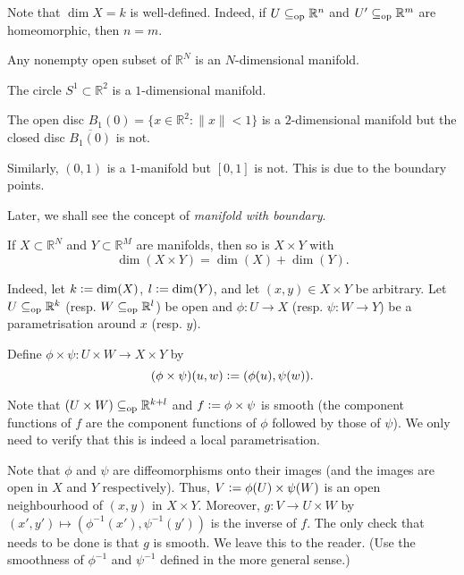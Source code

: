 Note that $\dim X = k$ is well-defined. Indeed, if $U \subseteq_{\operatorname{op}} \mathbb{R}^{n}$ and $U' \subseteq_{\operatorname{op}} \mathbb{R}^{m}$ are homeomorphic, then $n = m$.

\begin{ex}
	Any nonempty open subset of $\mathbb{R}^{N}$ is an $N$-dimensional manifold.
\end{ex}

\begin{ex}
	The circle $S^{1} \subset \mathbb{R}^{2}$ is a $1$-dimensional manifold.

	The open disc $B_{1}(0) = \{x \in \mathbb{R}^{2} : \|x\| < 1\}$ is a $2$-dimensional manifold but the closed disc $\overline{B_{1}(0)}$ is not. 

	Similarly, $(0, 1)$ is a $1$-manifold but $[0, 1]$ is not. This is due to the boundary points.

	Later, we shall see the concept of \emph{manifold with boundary}.
\end{ex}

\begin{ex}
	If $X \subset \mathbb{R}^{N}$ and $Y \subset \mathbb{R}^{M}$ are manifolds, then so is $X \times Y$ with
	\begin{equation*} 
		\boxed{\dim(X \times Y) = \dim(X) + \dim(Y).}
	\end{equation*}

	Indeed, let $k \vcentcolon= \dim(X)$, $l \vcentcolon= \dim(Y)$, and let $(x, y) \in X \times Y$ be arbitrary. Let $U \subseteq_{\operatorname{op}} \mathbb{R}^{k}$ (resp. $W \subseteq_{\operatorname{op}} \mathbb{R}^{l}$) be open and $\phi : U \to X$ (resp. $\psi : W \to Y$) be a parametrisation around $x$ (resp. $y$). 

	Define $\phi \times \psi : U \times W \to X \times Y$ by
	\begin{equation*} 
		(\phi \times \psi)(u, w) \vcentcolon= (\phi(u), \psi(w)).
	\end{equation*}

	Note that $(U \times W) \subseteq_{\operatorname{op}} \mathbb{R}^{k + l}$ and $f \vcentcolon= \phi \times \psi$ is smooth (the component functions of $f$ are the component functions of $\phi$ followed by those of $\psi$). We only need to verify that this is indeed a local parametrisation.

	Note that $\phi$ and $\psi$ are diffeomorphisms onto their images (and the images are open in $X$ and $Y$ respectively). Thus, $V \vcentcolon= \phi(U) \times \psi(W)$ is an open neighbourhood of $(x, y)$ in $X \times Y$. Moreover, $g : V \to U \times W$ by $(x', y') \mapsto (\phi^{-1}(x'), \psi^{-1}(y'))$ is the inverse of $f$. \newline
	The only check that needs to be done is that $g$ is smooth. We leave this to the reader. (Use the smoothness of $\phi^{-1}$ and $\psi^{-1}$ defined in the more general sense.)
\end{ex}

